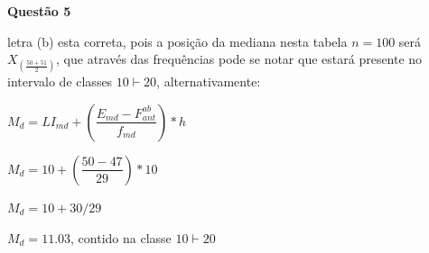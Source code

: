 \documentclass[12pt]{article}   %
\begin{document}
\par \textbf{Questão 5}
\vspace{+12pt}
\par letra (b) esta correta, pois a posição da mediana nesta tabela $n=100$ será $X_{(\frac{50+51}{2})}$, que através das frequências pode se notar que estará presente no intervalo de classes $10 \vdash 20$, alternativamente:
\vspace{+6pt}
\par $M_d = LI_{md} + (\dfrac{E_{md}-F_{ant}^{ab}}{f_{md}})*h$
\vspace{+6pt}
\par $M_d = 10 + (\dfrac{50-47}{29})*10$
\vspace{+6pt}
\par $M_d = 10 + 30/29$
\vspace{+6pt}
\par $M_d = 11.03$, contido na classe $10 \vdash 20$
\end{document}
